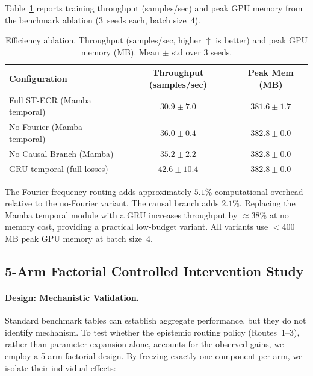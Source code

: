 \documentclass[11pt,a4paper]{article}
\begin{document}
Table~\ref{tab:efficiency} reports training throughput (samples/sec) and peak
GPU memory from the benchmark ablation ($3$~seeds each, batch size~$4$).

\begin{table}[ht]
\centering
\caption{Efficiency ablation. Throughput (samples/sec, higher $\uparrow$ is better)
and peak GPU memory (MB). Mean $\pm$ std over 3 seeds.}
\label{tab:efficiency}
\setlength{\tabcolsep}{10pt}
\begin{tabular}{lcc}
\toprule
Configuration & Throughput (samples/sec) & Peak Mem (MB) \\
\midrule
Full ST-ECR (Mamba temporal)    & $30.9 \pm 7.0$  & $381.6 \pm 1.7$ \\
No Fourier (Mamba temporal)     & $36.0 \pm 0.4$  & $382.8 \pm 0.0$ \\
No Causal Branch (Mamba)        & $35.2 \pm 2.2$  & $382.8 \pm 0.0$ \\
GRU temporal (full losses)      & $42.6 \pm 10.4$ & $382.8 \pm 0.0$ \\
\bottomrule
\end{tabular}
\end{table}

The Fourier-frequency routing adds approximately $5.1$\% computational
overhead relative to the no-Fourier variant.  The causal branch adds $2.1\%$.
Replacing the Mamba temporal module with a GRU increases throughput by $\approx
38\%$ at no memory cost, providing a practical low-budget variant.  All
variants use $<400$\,MB peak GPU memory at batch size~$4$.

\subsection{5-Arm Factorial Controlled Intervention Study}
\label{sec:factorial}

\paragraph{Design: Mechanistic Validation.}
Standard benchmark tables can establish aggregate performance, but they do not identify mechanism. To test whether the epistemic routing policy (Routes~1--3), rather than parameter expansion alone, accounts for the observed gains, we employ a 5-arm factorial design. By freezing exactly one component per arm, we isolate their individual effects:
\end{document}
